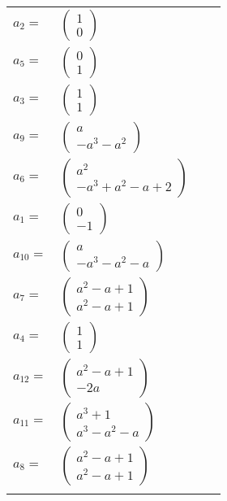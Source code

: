 \documentclass[1p]{elsarticle_modified}
\theoremstyle{definition}
\begin{document}
\begin{tabular}{m{7pt} m{180pt} m{7pt} m{180pt} }
\flushright $a_{2}=$&$\begin{pmatrix}1\\0\end{pmatrix}$ \\
\flushright $a_{5}=$&$\begin{pmatrix}0\\1\end{pmatrix}$ \\
\flushright $a_{3}=$&$\begin{pmatrix}1\\1\end{pmatrix}$ \\
\flushright $a_{9}=$&$\begin{pmatrix}a\\- a^3- a^2\end{pmatrix}$ \\
\flushright $a_{6}=$&$\begin{pmatrix}a^2\\- a^3+a^2- a+2\end{pmatrix}$ \\
\flushright $a_{1}=$&$\begin{pmatrix}0\\-1\end{pmatrix}$ \\
\flushright $a_{10}=$&$\begin{pmatrix}a\\- a^3- a^2- a\end{pmatrix}$ \\
\flushright $a_{7}=$&$\begin{pmatrix}a^2- a+1\\a^2- a+1\end{pmatrix}$ \\
\flushright $a_{4}=$&$\begin{pmatrix}1\\1\end{pmatrix}$ \\
\flushright $a_{12}=$&$\begin{pmatrix}a^2- a+1\\-2 a\end{pmatrix}$ \\
\flushright $a_{11}=$&$\begin{pmatrix}a^3+1\\a^3- a^2- a\end{pmatrix}$ \\
\flushright $a_{8}=$&$\begin{pmatrix}a^2- a+1\\a^2- a+1\end{pmatrix}$\\&\end{tabular}
\end{document}
